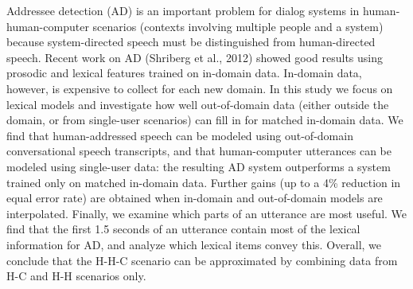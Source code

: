Addressee detection (AD) is an important problem for dialog systems in human-human-computer scenarios (contexts involving multiple people and a
 system) because system-directed speech must be distinguished from
 human-directed speech. Recent work on AD (Shriberg et al., 2012) showed good
 results using prosodic and lexical features trained on in-domain data.
 In-domain data, however, is expensive to collect for each new domain. In this
 study we focus on lexical models and investigate how well out-of-domain data
 (either outside the domain, or from single-user scenarios) can fill in for
 matched in-domain data. We find that human-addressed speech can be modeled
 using out-of-domain conversational speech transcripts, and that human-computer
 utterances can be modeled using single-user data: the resulting AD system
 outperforms a system trained only on matched in-domain data. Further gains (up
 to a 4\% reduction in equal error rate) are obtained when in-domain and
 out-of-domain models are interpolated. Finally, we examine which parts of an
 utterance are most useful. We find that the first 1.5 seconds of an utterance
 contain most of the lexical information for AD, and analyze which lexical items
 convey this. Overall, we conclude that the H-H-C scenario can be approximated
 by combining data from H-C and H-H scenarios only.


